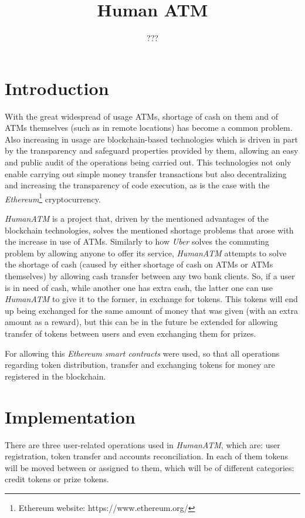 \documentclass[a4paper]{article}
\title{Human ATM}
\author{???}
\begin{document}
\maketitle

\section{Introduction}

With the great widespread of usage ATMs, shortage of cash on them and of ATMs themselves (such as in remote locations) has become a common problem. Also increasing in usage are blockchain-based technologies which is driven in part by the transparency and safeguard properties provided by them, allowing an easy and public audit of the operations being carried out. This technologies not only enable carrying out simple money transfer transactions but also decentralizing and increasing the transparency of code execution, as is the case with the \textit{Ethereum}\footnote{Ethereum website: https://www.ethereum.org/} cryptocurrency.

\textit{HumanATM} is a project that, driven by the mentioned advantages of the blockchain technologies, solves the mentioned shortage problems that arose with the increase in use of ATMs. Similarly to how \textit{Uber} solves the commuting problem by allowing anyone to offer its service, \textit{HumanATM} attempts to solve the shortage of cash (caused by either shortage of cash on ATMs or ATMs themselves) by allowing cash transfer between any two bank clients. So, if a user is in need of cash, while another one has extra cash, the latter one can use \textit{HumanATM} to give it to the former, in exchange for tokens. This tokens will end up being exchanged for the same amount of money that was given (with an extra amount as a reward), but this can be in the future be extended for allowing transfer of tokens between users and even exchanging them for prizes.

For allowing this \textit{Ethereum smart contracts} were used, so that all operations regarding token distribution, transfer and exchanging tokens for money are registered in the blockchain.

\section{Implementation}

There are three user-related operations used in \textit{HumanATM}, which are: user registration, token transfer and accounts reconciliation. In each of them tokens will be moved between or assigned to them, which will be of different categories: credit tokens or prize tokens.
\end{document}
